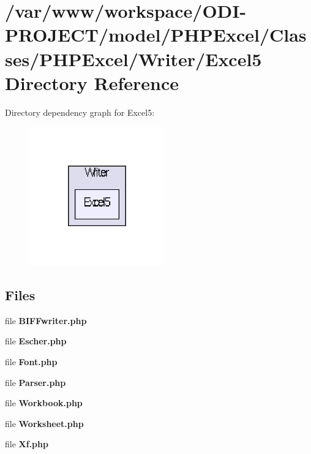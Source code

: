 \section{/var/www/workspace/\+O\+D\+I-\/\+P\+R\+O\+J\+E\+C\+T/model/\+P\+H\+P\+Excel/\+Classes/\+P\+H\+P\+Excel/\+Writer/\+Excel5 Directory Reference}
\label{dir_5c31826e8d320125c0f4f5a01669ec95}
Directory dependency graph for Excel5\+:\nopagebreak
\begin{figure}[H]
\begin{center}
\leavevmode
\includegraphics[width=166pt]{dir_5c31826e8d320125c0f4f5a01669ec95_dep}
\end{center}
\end{figure}
\subsection*{Files}
\begin{DoxyCompactItemize}
\item 
file {\bfseries B\+I\+F\+Fwriter.\+php}
\item 
file {\bfseries Escher.\+php}
\item 
file {\bfseries Font.\+php}
\item 
file {\bfseries Parser.\+php}
\item 
file {\bfseries Workbook.\+php}
\item 
file {\bfseries Worksheet.\+php}
\item 
file {\bfseries Xf.\+php}
\end{DoxyCompactItemize}
